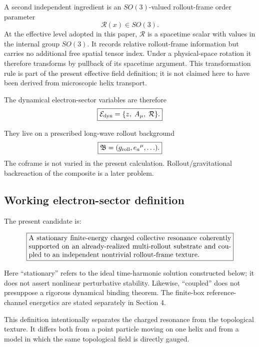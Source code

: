 \documentclass[11pt]{article}
\begin{document}
A second independent ingredient is an \(SO(3)\)-valued rollout-frame order parameter
\begin{equation}
\mathcal R(x)\in SO(3).
\end{equation}
At the effective level adopted in this paper, \(\mathcal R\) is a spacetime scalar with values in the internal group \(SO(3)\). It records relative rollout-frame information but carries no additional free spatial tensor index. Under a physical-space rotation it therefore transforms by pullback of its spacetime argument. This transformation rule is part of the present effective field definition; it is not claimed here to have been derived from microscopic helix transport.

The dynamical electron-sector variables are therefore
\begin{equation}
\boxed{
\mathcal E_{\rm dyn}
=
\{z,\;A_\mu,\;\mathcal R\}.
}
\end{equation}

They live on a prescribed long-wave rollout background
\begin{equation}
\boxed{
\mathfrak B
=
(g_{\rm roll},e_a{}^\mu,\ldots).
}
\end{equation}
The coframe is not varied in the present calculation. Rollout/gravitational backreaction of the composite is a later problem.

\subsection{Working electron-sector definition}

The present candidate is:

\begin{equation}
\boxed{
\begin{minipage}{0.84\linewidth}
A stationary finite-energy charged collective resonance coherently supported on an already-realized multi-rollout substrate and coupled to an independent nontrivial rollout-frame texture.
\end{minipage}
}
\end{equation}

Here ``stationary'' refers to the ideal time-harmonic solution constructed below; it does not assert nonlinear perturbative stability. Likewise, ``coupled'' does not presuppose a rigorous dynamical binding theorem. The finite-box reference-channel energetics are stated separately in Section 4.

This definition intentionally separates the charged resonance from the topological texture. It differs both from a point particle moving on one helix and from a model in which the same topological field is directly gauged.
\end{document}
